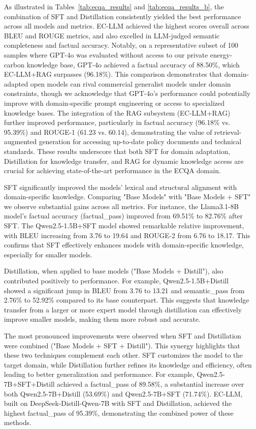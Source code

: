 \documentclass[]{interact}
\theoremstyle{plain}%
\theoremstyle{definition}
\theoremstyle{remark}
\begin{document}
As illustrated in Tables~\ref{tab:ecqa_results} and \ref{tab:ecqa_results_b}, the combination of SFT and Distillation consistently yielded the best performance across all models and metrics. EC-LLM achieved the highest scores overall across BLEU and ROUGE metrics, and also excelled in LLM-judged semantic completeness and factual accuracy. Notably, on a representative subset of 100 samples where GPT-4o was evaluated without access to our private energy-carbon knowledge base, GPT-4o achieved a factual accuracy of 88.50\%, which EC-LLM+RAG surpasses (96.18\%). This comparison demonstrates that domain-adapted open models can rival commercial generalist models under domain constraints, though we acknowledge that GPT-4o's performance could potentially improve with domain-specific prompt engineering or access to specialized knowledge bases. The integration of the RAG subsystem (EC-LLM+RAG) further improved performance, particularly in factual accuracy (96.18\% vs. 95.39\%) and ROUGE-1 (61.23 vs. 60.14), demonstrating the value of retrieval-augmented generation for accessing up-to-date policy documents and technical standards. These results underscore that both SFT for domain adaptation, Distillation for knowledge transfer, and RAG for dynamic knowledge access are crucial for achieving state-of-the-art performance in the ECQA domain.

SFT significantly improved the models' lexical and structural alignment with domain-specific knowledge. Comparing "Base Models" with "Base Models + SFT"  we observe substantial gains across all metrics. For instance, the Llama3.1-8B model's factual accuracy (factual\_pass) improved from 69.51\% to 82.76\% after SFT. The Qwen2.5-1.5B+SFT model showed remarkable relative improvement, with BLEU increasing from 3.76 to 19.64 and ROUGE-2 from 6.76 to 18.17. This confirms that SFT effectively enhances models with domain-specific knowledge, especially for smaller models. 

Distillation, when applied to base models ("Base Models + Distill"), also contributed positively to performance. For example, Qwen2.5-1.5B+Distill showed a significant jump in BLEU from 3.76 to 13.21 and semantic\_pass from 2.76\% to 52.92\% compared to its base counterpart. This suggests that knowledge transfer from a larger or more expert model through distillation can effectively improve smaller models, making them more robust and accurate. 

The most pronounced improvements were observed when SFT and Distillation were combined ("Base Models + SFT + Distill"). This synergy highlights that these two techniques complement each other. SFT customizes the model to the target domain, while Distillation further refines its knowledge and efficiency, often leading to better generalization and performance. For example, Qwen2.5-7B+SFT+Distill achieved a factual\_pass of 89.58\%, a substantial increase over both Qwen2.5-7B+Distill (53.69\%) and Qwen2.5-7B+SFT (71.74\%). EC-LLM, built on DeepSeek-Distill-Qwen-7B with SFT and Distillation, achieved the highest factual\_pass of 95.39\%, demonstrating the combined power of these methods. 
\end{document}
